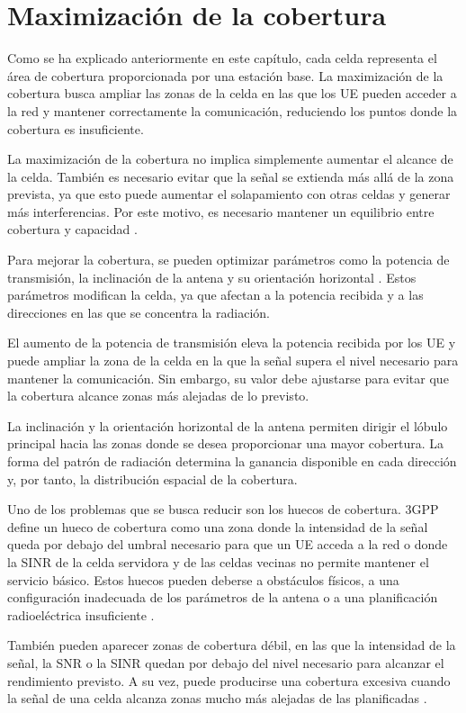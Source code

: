 \section{Maximización de la cobertura}

Como se ha explicado anteriormente en este capítulo, cada celda representa el área de cobertura proporcionada por una estación base. La maximización de la cobertura busca ampliar las zonas de la celda en las que los UE pueden acceder a la red y mantener correctamente la comunicación, reduciendo los puntos donde la cobertura es insuficiente.

La maximización de la cobertura no implica simplemente aumentar el alcance de la celda. También es necesario evitar que la señal se extienda más allá de la zona prevista, ya que esto puede aumentar el solapamiento con otras celdas y generar más interferencias. Por este motivo, es necesario mantener un equilibrio entre cobertura y capacidad \cite{etsi132522}.

Para mejorar la cobertura, se pueden optimizar parámetros como la potencia de transmisión, la inclinación de la antena y su orientación horizontal \cite{etsi132522}. Estos parámetros modifican la celda, ya que afectan a la potencia recibida y a las direcciones en las que se concentra la radiación.

El aumento de la potencia de transmisión eleva la potencia recibida por los UE y puede ampliar la zona de la celda en la que la señal supera el nivel necesario para mantener la comunicación. Sin embargo, su valor debe ajustarse para evitar que la cobertura alcance zonas más alejadas de lo previsto.

La inclinación y la orientación horizontal de la antena permiten dirigir el lóbulo principal hacia las zonas donde se desea proporcionar una mayor cobertura. La forma del patrón de radiación determina la ganancia disponible en cada dirección y, por tanto, la distribución espacial de la cobertura.

Uno de los problemas que se busca reducir son los huecos de cobertura. 3GPP define un hueco de cobertura como una zona donde la intensidad de la señal queda por debajo del umbral necesario para que un UE acceda a la red o donde la SINR de la celda servidora y de las celdas vecinas no permite mantener el servicio básico. Estos huecos pueden deberse a obstáculos físicos, a una configuración inadecuada de los parámetros de la antena o a una planificación radioeléctrica insuficiente \cite{etsi132522}.

También pueden aparecer zonas de cobertura débil, en las que la intensidad de la señal, la SNR o la SINR quedan por debajo del nivel necesario para alcanzar el rendimiento previsto. A su vez, puede producirse una cobertura excesiva cuando la señal de una celda alcanza zonas mucho más alejadas de las planificadas \cite{etsi132522}.

